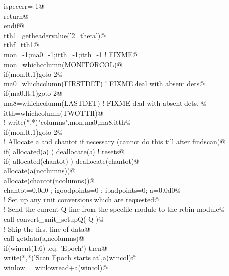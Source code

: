 \documentclass[10pt,a4paper,notitlepage]{article}
\begin{document}
\begin{flushleft}
\begin{list}{}{}
\mbox{}\verb@        ispecerr=-1@\\
\mbox{}\verb@        return@\\
\mbox{}\verb@      endif@\\
\mbox{}\verb@      tth1=getheadervalue('2_theta')@\\
\mbox{}\verb@      tthf=tth1@\\
\mbox{}\verb@      mon=-1;ma0=-1;itth=-1;itth=-1    ! FIXME@\\
\mbox{}\verb@      mon=whichcolumn(MONITORCOL)@\\
\mbox{}\verb@      if(mon.lt.1)goto 2@\\
\mbox{}\verb@      ma0=whichcolumn(FIRSTDET) ! FIXME deal with absent dets@\\
\mbox{}\verb@      if(ma0.lt.1)goto 2@\\
\mbox{}\verb@      ma8=whichcolumn(LASTDET) ! FIXME deal with absent dets.      @\\
\mbox{}\verb@      itth=whichcolumn(TWOTTH)@\\
\mbox{}\verb@!      write(*,*)"columns",mon,ma0,ma8,itth@\\
\mbox{}\verb@      if(mon.lt.1)goto 2@\\
\mbox{}\verb@! Allocate a and chantot if necessary (cannot do this till after findscan)@\\
\mbox{}\verb@      if( allocated(a) ) deallocate(a) ! resets@\\
\mbox{}\verb@      if( allocated(chantot) ) deallocate(chantot)@\\
\mbox{}\verb@      allocate(a(ncolumns))@\\
\mbox{}\verb@      allocate(chantot(ncolumns))@\\
\mbox{}\verb@      chantot=0.0d0 ; igoodpoints=0 ; ibadpoints=0; a=0.0d0@\\
\mbox{}\verb@! Set up any unit conversions which are requested@\\
\mbox{}\verb@!   Send the current Q line from the specfile module to the rebin module@\\
\mbox{}\verb@      call convert_unit_setupQ( Q )@\\
\mbox{}\verb@! Skip the first line of data@\\
\mbox{}\verb@      call getdata(a,ncolumns)@\\
\mbox{}\verb@      if(wincnt(1:6) .eq. 'Epoch') then@\\
\mbox{}\verb@         write(*,*)'Scan Epoch starts at',a(wincol)@\\
\mbox{}\verb@         winlow = winlowread+a(wincol)@\\

\end{list}
\end{flushleft}
\end{document}
